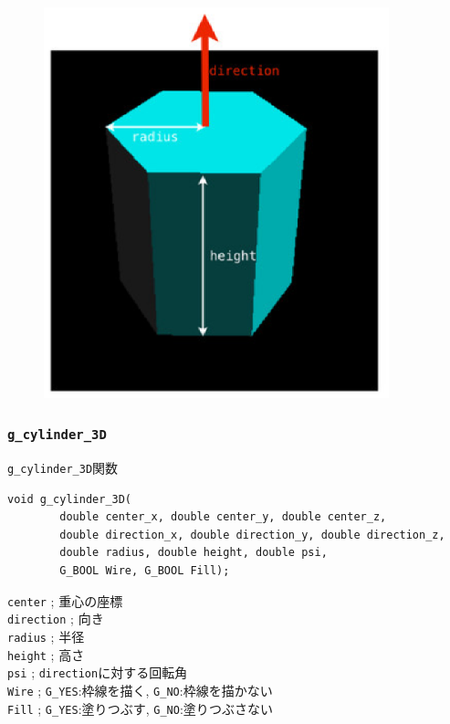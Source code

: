 \documentclass[platex,a4paper,12pt]{jsarticle}%
\begin{document}
\begin{figure}[htb]
\centering
\includegraphics[width=100mm]{Canvas_g_prism.eps}
\end{figure}




\clearpage
\subsubsection{\texttt{g\_cylinder\_3D}}

\begin{itembox}[l]{\texttt{g\_cylinder\_3D}関数}
\begin{verbatim}
void g_cylinder_3D(
        double center_x, double center_y, double center_z,
        double direction_x, double direction_y, double direction_z,
        double radius, double height, double psi,
        G_BOOL Wire, G_BOOL Fill);   
\end{verbatim}
\verb|center| ; 重心の座標\\
\verb|direction| ; 向き\\
\verb|radius| ; 半径\\
\verb|height| ; 高さ\\
\verb|psi| ; \verb|direction|に対する回転角\\
\verb|Wire| ; \verb|G_YES|:枠線を描く, \verb|G_NO|:枠線を描かない \\
\verb|Fill| ; \verb|G_YES|:塗りつぶす, \verb|G_NO|:塗りつぶさない
\end{itembox}
\end{document}
